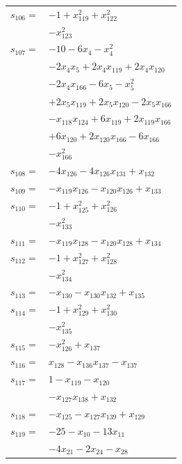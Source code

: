\begin{longtable}{@{}r@{\;}l@{}}
\(s_{106}=\) & \(\displaystyle -1 +x_{119}^{2} +x_{122}^{2}\) \\
 & \(\displaystyle -x_{123}^{2}\) \\[3pt]
\(s_{107}=\) & \(\displaystyle -10 -6x_{4} -x_{4}^{2}\) \\
 & \(\displaystyle -2x_{4}x_{5} +2x_{4}x_{119} +2x_{4}x_{120}\) \\
 & \(\displaystyle -2x_{4}x_{166} -6x_{5} -x_{5}^{2}\) \\
 & \(\displaystyle +2x_{5}x_{119} +2x_{5}x_{120} -2x_{5}x_{166}\) \\
 & \(\displaystyle -x_{118}x_{124} +6x_{119} +2x_{119}x_{166}\) \\
 & \(\displaystyle +6x_{120} +2x_{120}x_{166} -6x_{166}\) \\
 & \(\displaystyle -x_{166}^{2}\) \\[3pt]
\(s_{108}=\) & \(\displaystyle -4x_{126} -4x_{126}x_{131} +x_{132}\) \\[3pt]
\(s_{109}=\) & \(\displaystyle -x_{119}x_{126} -x_{120}x_{126} +x_{133}\) \\[3pt]
\(s_{110}=\) & \(\displaystyle -1 +x_{125}^{2} +x_{126}^{2}\) \\
 & \(\displaystyle -x_{133}^{2}\) \\[3pt]
\(s_{111}=\) & \(\displaystyle -x_{119}x_{128} -x_{120}x_{128} +x_{134}\) \\[3pt]
\(s_{112}=\) & \(\displaystyle -1 +x_{127}^{2} +x_{128}^{2}\) \\
 & \(\displaystyle -x_{134}^{2}\) \\[3pt]
\(s_{113}=\) & \(\displaystyle -x_{130} -x_{130}x_{132} +x_{135}\) \\[3pt]
\(s_{114}=\) & \(\displaystyle -1 +x_{129}^{2} +x_{130}^{2}\) \\
 & \(\displaystyle -x_{135}^{2}\) \\[3pt]
\(s_{115}=\) & \(\displaystyle -x_{126}^{2} +x_{137}\) \\[3pt]
\(s_{116}=\) & \(\displaystyle x_{128} -x_{136}x_{137} -x_{137}\) \\[3pt]
\(s_{117}=\) & \(\displaystyle 1 -x_{119} -x_{120}\) \\
 & \(\displaystyle -x_{127}x_{138} +x_{132}\) \\[3pt]
\(s_{118}=\) & \(\displaystyle -x_{125} -x_{127}x_{139} +x_{129}\) \\[3pt]
\(s_{119}=\) & \(\displaystyle -25 -x_{10} -13x_{11}\) \\
 & \(\displaystyle -4x_{21} -2x_{24} -x_{28}\) \\

\end{longtable}
